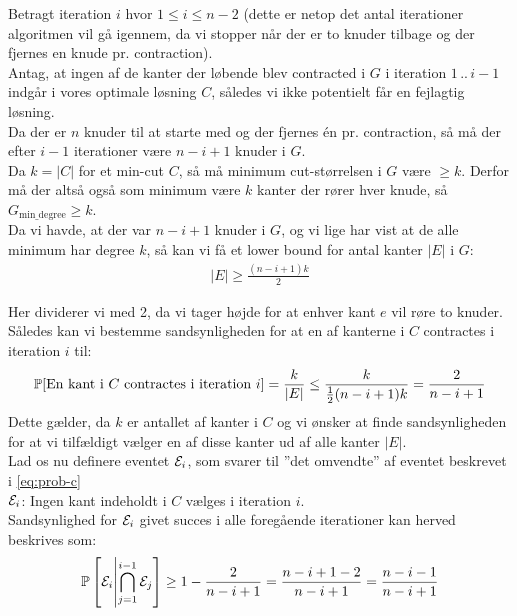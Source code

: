 Betragt iteration $i$ hvor $1 \leq i \leq n-2$ (dette er netop det antal iterationer algoritmen vil gå igennem, da vi stopper når der er to knuder tilbage og der fjernes en knude pr. contraction).\\


Antag, at ingen af de kanter der løbende blev contracted i $G$ i iteration $1 \, .. \, i-1$  indgår i vores optimale løsning $C$, således vi ikke potentielt får en fejlagtig løsning.\\

Da der er $n$ knuder til at starte med og der fjernes én pr. contraction, så må der efter $i-1$ iterationer være $n-i+1$ knuder i $G$.\\

Da $k = |C|$ for et min-cut $C$, så må minimum cut-størrelsen i $G$ være $\geq k$. Derfor må der altså også som minimum være $k$ kanter der rører hver knude, så $G_{\text{min\_degree}} \geq k$.\\

Da vi havde, at der var $n-i+1$ knuder i $G$, og vi lige har vist at de alle minimum har degree $k$, så kan vi få et lower bound for antal kanter $|E|$ i $G$:
\begin{align*}
|E| \geq \frac{(n-i+1)k}{2}
\end{align*}

Her dividerer vi med 2, da vi tager højde for at enhver kant $e$ vil røre to knuder.\\

Således kan vi bestemme sandsynligheden for at en af kanterne i $C$ contractes i iteration $i$ til:
\begin{align} \label{eq:prob-c}
\P[\text{En kant i $C$ contractes i iteration $i$}] = \frac{k}{|E|} \leq \frac{k}{\frac{1}{2}(n-i+1)k} = \frac{2}{n-i+1}
\end{align}
Dette gælder, da $k$ er antallet af kanter i $C$ og vi ønsker at finde sandsynligheden for at vi tilfældigt vælger en af disse kanter ud af alle kanter $|E|$.\\

Lad os nu definere eventet $\E_i$, som svarer til ''det omvendte'' af eventet beskrevet i \cref{eq:prob-c}\\
$\E_i$: Ingen kant indeholdt i $C$ vælges i iteration $i$.\\

Sandsynlighed for $\E_i$ givet succes i alle foregående iterationer kan herved beskrives som:
\begin{align} \label{eq:prob-succes-given-former-succes}
    \P \square{ \E_i \middle| \bigcap_{j=1}^{i-1} \E_j} \geq 1 - \frac{2}{n-i+1} = \frac{n-i+1-2}{n-i+1} = \frac{n-i-1}{n-i+1}
\end{align}




